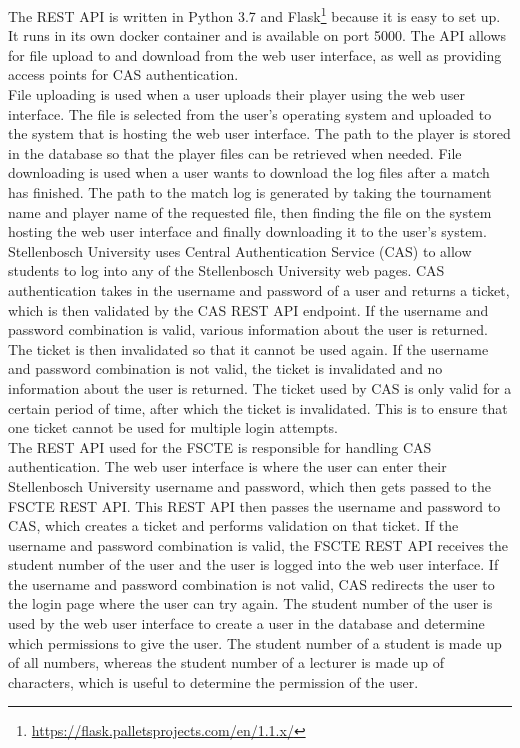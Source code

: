 \documentclass[a4paper, 11pt]{report}
\begin{document}
The REST API is written in Python 3.7 and Flask\footnote{\url{https://flask.palletsprojects.com/en/1.1.x/}}
because it is easy to set up. It runs in its own docker container and is
available on port 5000. The API allows for file upload to and download from the
web user interface, as well as providing access points for CAS authentication. \\

File uploading is used when a user uploads their player using the web user
interface. The file is selected from the user's operating system and uploaded
to the system that is hosting the web user interface. The path to the player
is stored in the database so that the player files can be retrieved when needed.
File downloading is used when a user wants to download the log files after
a match has finished. The path to the match log is generated by taking the
tournament name and player name of the requested file, then finding the file on
the system hosting the web user interface and finally downloading it to the user's
system. \\

Stellenbosch University uses Central Authentication Service (CAS) to allow
students to log into any of the Stellenbosch University web pages. CAS
authentication takes in the username and password of a user and returns a ticket,
which is then validated by the CAS REST API endpoint. If the username and password
combination is valid, various information about the user is returned. The ticket is
then invalidated so that it cannot be used again. If the username and password
combination is not valid, the ticket is invalidated and no information about the
user is returned. The ticket used by CAS is only valid for a certain period of
time, after which the ticket is invalidated. This is to ensure that one ticket
cannot be used for multiple login attempts. \\

The REST API used for the FSCTE is responsible for handling CAS authentication.
The web user interface is where the user can enter their Stellenbosch University
username and password, which then gets passed to the FSCTE REST API. This REST
API then passes the username and password to CAS, which creates a ticket and
performs validation on that ticket. If the username and password combination is
valid, the FSCTE REST API receives the student number of the user and the user
is logged into the web user interface. If the username and password combination
is not valid, CAS redirects the user to the login page where the user can try again.
The student number of the user is used by the web user interface to create a user
in the database and determine which permissions to give the user. The student number
of a student is made up of all numbers, whereas the student number of a lecturer
is made up of characters, which is useful to determine the permission of the user. \\
\end{document}
